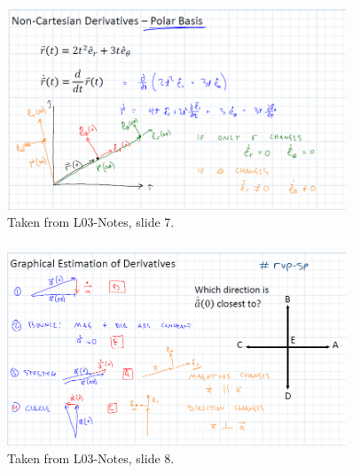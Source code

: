     \subsubsection{}
\begin{figure}[h!]
\centering
\includegraphics[width=0.9\textwidth]{VectorCalculusFigures/Non-Cartesian Polar Basis.png}
\vspace{-2mm}
\caption{\small Taken from L03-Notes, slide 7.}
\vspace{-3mm}
\label{Fig:Non-CartesianPolarBasis}
\end{figure}
    
    \subsubsection{}
\begin{figure}[h!]
\centering
\includegraphics[width=0.9\textwidth]{VectorCalculusFigures/Graphical Estimation of Derivatives.png}
\vspace{-2mm}
\caption{\small Taken from L03-Notes, slide 8.}
\vspace{-3mm}
\label{Fig:GraphicalEstimation}
\end{figure}

